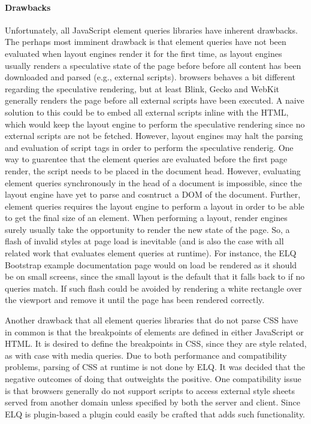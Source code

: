 \documentclass[a4paper,11pt]{kth-mag}
\begin{document}
    \paragraph{Drawbacks}
    Unfortunately, all \gls{JavaScript} element queries libraries have inherent drawbacks.
    The perhaps most imminent drawback is that element queries have not been evaluated when \glspl{layout engine} render it for the first time, as \glspl{layout engine} usually renders a speculative state of the page before before all content has been downloaded and parsed (e.g., external scripts).
    \Glspl{browser} behaves a bit different regarding the speculative rendering, but at least \gls{Blink}, \gls{Gecko} and \gls{WebKit} generally renders the page before all external scripts have been executed.
    A naive solution to this could be to embed all external scripts inline with the \gls{HTML}, which would keep the \gls{layout engine} to perform the speculative rendering since no external scripts are not be fetched.
    However, \glspl{layout engine} may halt the parsing and evaluation of script tags in order to perform the speculative renderig.
    One way to guarentee that the element queries are evaluated before the first page render, the script needs to be placed in the \gls{document} head.
    However, evaluating element queries synchronously in the head of a \gls{document} is impossible, since the \gls{layout engine} have yet to parse and cosntruct a \gls{DOM} of the \gls{document}.
    Further, element queries requires the \gls{layout engine} to perform a layout in order to be able to get the final size of an \gls{element}.
    When performing a layout, render engines surely usually take the opportunity to render the new state of the page.
    So, a flash of invalid styles at page load is inevitable (and is also the case with all related work that evaluates element queries at runtime).
    For instance, the \gls{ELQ} \gls{Bootstrap} example documentation page would on load be rendered as it should be on small screens, since the small layout is the default that it falls back to if no queries match.
    If such flash could be avoided by rendering a white rectangle over the \gls{viewport} and remove it until the page has been rendered correctly.

    Another drawback that all element queries libraries that do not parse \gls{CSS} have in common is that the breakpoints of \glspl{element} are defined in either \gls{JavaScript} or \gls{HTML}.
    It is desired to define the breakpoints in \gls{CSS}, since they are style related, as with case with \gls{media queries}.
    Due to both performance and compatibility problems, parsing of \gls{CSS} at runtime is not done by \gls{ELQ}.
    It was decided that the negative outcomes of doing that outweights the positive.
    One compatibility issue is that \glspl{browser} generally do not support scripts to access external style sheets served from another domain unless specified by both the server and client.
    Since \gls{ELQ} is plugin-based a plugin could easily be crafted that adds such functionality.
\end{document}
